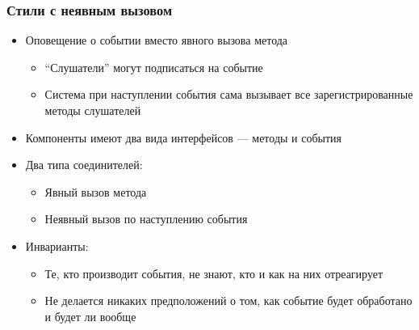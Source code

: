 \documentclass[xetex,mathserif,serif]{beamer}
\begin{document}
    \begin{frame}
        \frametitle{Стили с неявным вызовом}
        \begin{itemize}
            \item Оповещение о событии вместо явного вызова метода
            \begin{itemize}
                \item ``Слушатели'' могут подписаться на событие
                \item Система при наступлении события сама вызывает все зарегистрированные методы слушателей
            \end{itemize}
            \item Компоненты имеют два вида интерфейсов --- методы и события
            \item Два типа соединителей:
            \begin{itemize}
                \item Явный вызов метода
                \item Неявный вызов по наступлению события
            \end{itemize}
            \item Инварианты:
            \begin{itemize}
                \item Те, кто производит события, не знают, кто и как на них отреагирует
                \item Не делается никаких предположений о том, как событие будет обработано и будет ли вообще
            \end{itemize}
        \end{itemize}
    \end{frame}
\end{document}
